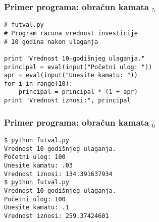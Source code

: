 \documentclass[utf8,compress,aspectratio=169]{beamer}
\begin{document}

\begin{frame}[fragile]
  \frametitle{Primer programa: obračun kamata $_5$}
\begin{verbatim}
# futval.py
# Program racuna vrednost investicije
# 10 godina nakon ulaganja

print "Vrednost 10-godišnjeg ulaganja."
principal = eval(input("Početni ulog: "))
apr = eval(input("Unesite kamatu: "))
for i in range(10):
    principal = principal * (1 + apr)
print "Vrednost iznosi:", principal
\end{verbatim}
\end{frame}

\begin{frame}[fragile]
  \frametitle{Primer programa: obračun kamata $_6$}
\begin{verbatim}
$ python futval.py
Vrednost 10-godišnjeg ulaganja.
Početni ulog: 100
Unesite kamatu: .03
Vrednost iznosi: 134.391637934
$ python futval.py
Vrednost 10-godišnjeg ulaganja.
Početni ulog: 100
Unesite kamatu: .1
Vrednost iznosi: 259.37424601
\end{verbatim}
\end{frame}
\end{document}
